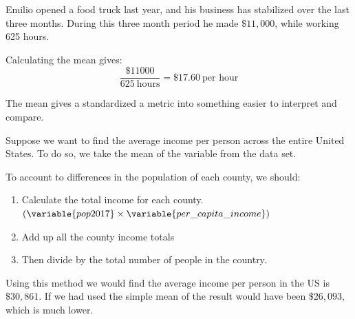\documentclass[handout]{beamer}
\begin{document}
\begin{frame}
\begin{example}
Emilio opened a food truck last year, and his business has stabilized over the last three months. During this three month period he made $\$11,000$, while working 625 hours.

\vspace{1mm}
\pause
{}\pause

\vspace{1mm}
Calculating the mean gives:
\begin{equation*}
\dfrac{\$11000}{625~\text{hours}} = \$17.60~\text{per hour}
\end{equation*}
\end{example}\pause

\begin{note}
The mean gives a standardized a metric into something easier to interpret and compare.
\end{note}
\end{frame}

\begin{frame}
\begin{example}
Suppose we want to find the average income per person across the entire United States. To do so, we take the mean of the  variable from the  data set.

\vspace{1mm}
\pause
{}\pause

\vspace{1mm}
To account to differences in the population of each county, we should:
\begin{enumerate}
\item Calculate the total income for each county. {\small$\left(\variable{pop2017}\times\variable{per\_capita\_income}\right)$}\pause
\item Add up all the county income totals\pause
\item Then divide by the total number of people in the country.\pause
\end{enumerate}

Using this method we would find the average income per person in the US is $\$30,861$. If we had used the simple mean of  the result would have been $\$26,093$, which is much lower.
\end{example}
\end{frame}
\end{document}
